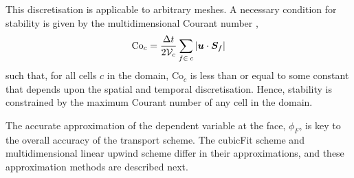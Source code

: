 This discretisation is applicable to arbitrary meshes.  A necessary condition for stability is given by the multidimensional Courant number \citep{weller-shahrokhi2014},
\begin{align}
	\mathrm{Co}_c = \frac{\Delta t}{2 \mathcal{V}_c} \sum_{f \in\: c} \left\lvert \bm{u} \cdot \bm{S}_f \right\rvert \label{eqn:co}
\end{align}
such that, for all cells $c$ in the domain, $\mathrm{Co}_c$ is less than or equal to some constant that depends upon the spatial and temporal discretisation.  Hence, stability is constrained by the maximum Courant number of any cell in the domain.

The accurate approximation of the dependent variable at the face, $\phi_F$, is key to the overall accuracy of the transport scheme. The cubicFit scheme and  multidimensional linear upwind scheme differ in their approximations, and these approximation methods are described next.

